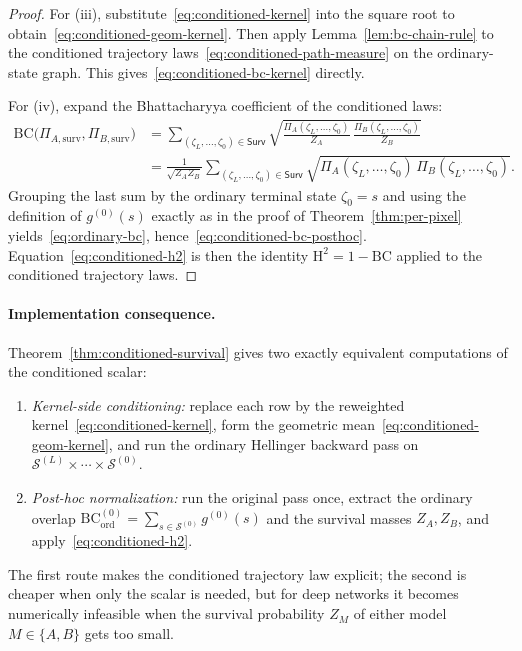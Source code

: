 \documentclass[twoside]{article}
\newcommand{\1}{\mathbf{1}}
\begin{document}
\begin{proof}
For (iii), substitute~\eqref{eq:conditioned-kernel} into the square root to
obtain~\eqref{eq:conditioned-geom-kernel}.  Then apply Lemma~\ref{lem:bc-chain-rule} to the
conditioned trajectory laws~\eqref{eq:conditioned-path-measure} on the ordinary-state graph.  This
gives~\eqref{eq:conditioned-bc-kernel} directly.

For (iv), expand the Bhattacharyya coefficient of the conditioned laws:
\begin{align}
    \mathrm{BC}\!\bigl(\Pi_{A,\mathrm{surv}}, \Pi_{B,\mathrm{surv}}\bigr)
    &=
    \sum_{(\zeta_L,\ldots,\zeta_0)\in\mathsf{Surv}}
    \sqrt{\frac{\Pi_A(\zeta_L,\ldots,\zeta_0)}{Z_A}\,
    \frac{\Pi_B(\zeta_L,\ldots,\zeta_0)}{Z_B}} \\
    &=
    \frac{1}{\sqrt{Z_A Z_B}}
    \sum_{(\zeta_L,\ldots,\zeta_0)\in\mathsf{Surv}}
    \sqrt{\Pi_A(\zeta_L,\ldots,\zeta_0)\, \Pi_B(\zeta_L,\ldots,\zeta_0)}.
\end{align}
Grouping the last sum by the ordinary terminal state $\zeta_0=s$ and using the definition of
$g^{(0)}(s)$ exactly as in the proof of Theorem~\ref{thm:per-pixel} yields~\eqref{eq:ordinary-bc},
hence~\eqref{eq:conditioned-bc-posthoc}.  Equation~\eqref{eq:conditioned-h2} is then the identity
$\mathrm{H}^2 = 1 - \mathrm{BC}$ applied to the conditioned trajectory laws.
\end{proof}

\paragraph{Implementation consequence.}
Theorem~\ref{thm:conditioned-survival} gives two exactly equivalent computations of the conditioned
scalar:
\begin{enumerate}
    \item[(a)] \emph{Kernel-side conditioning:} replace each row by the reweighted
        kernel~\eqref{eq:conditioned-kernel}, form the geometric mean~\eqref{eq:conditioned-geom-kernel},
        and run the ordinary Hellinger backward pass on $\mathcal{S}^{(L)} \times \cdots \times
            \mathcal{S}^{(0)}$.
    \item[(b)] \emph{Post-hoc normalization:} run the original pass once, extract the ordinary overlap
        $\mathrm{BC}_{\mathrm{ord}}^{(0)} = \sum_{s \in \mathcal{S}^{(0)}} g^{(0)}(s)$ and the survival
        masses $Z_A, Z_B$, and apply~\eqref{eq:conditioned-h2}.
\end{enumerate}
The first route makes the conditioned trajectory law explicit; the second is cheaper when only the
scalar is needed, but for deep networks it becomes numerically infeasible when the survival
probability $Z_M$ of either model $M \in \{A,B\}$ gets too small.
\end{document}
